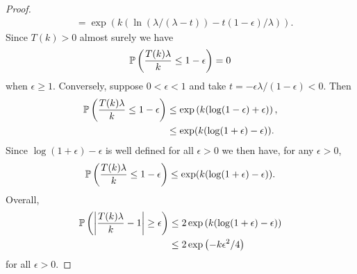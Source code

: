 \begin{proof}
\begin{align}
			&= \exp\left(k\left(\ln(\lambda/(\lambda - t)) - t(1 - \epsilon)/\lambda\right)\right).
		\end{align}
		Since $T(k) > 0$ almost surely we have
		\begin{equation}
			\mathbb{P}\left(\frac{T(k)\lambda}{k} \leq 1 - \epsilon \right) = 0
		\end{equation}
		when $\epsilon \geq 1$. Conversely, suppose $0 < \epsilon < 1$ and take $t = -\epsilon\lambda/(1 - \epsilon) < 0$. Then
		\begin{align}
			\mathbb{P}\left(\frac{T(k) \lambda}{k} \leq 1  - \epsilon\right) &\leq \exp\left(k(\log(1 - \epsilon) + \epsilon)\right),\\
			&\leq \exp(k(\log(1+\epsilon) - \epsilon)).
		\end{align}
		Since $\log(1+\epsilon) - \epsilon$ is well defined for all $\epsilon > 0$ we then have, for any $\epsilon > 0$,
		\begin{equation}
			\mathbb{P}\left(\frac{T(k)\lambda}{k} \leq 1 - \epsilon\right) \leq \exp(k(\log(1 + \epsilon) - \epsilon)).
		\end{equation}
		Overall,
		\begin{align}
			\prob\left(\left|\frac{T(k) \lambda}{k} - 1\right| \geq \epsilon \right) %
			&\leq 2 \exp\left(k (\log(1 + \epsilon) - \epsilon )\right)\\
			&\leq 2 \exp\left(-k \epsilon^2 /4\right)
		\end{align}
		for all $\epsilon  > 0$.
	\end{proof}

